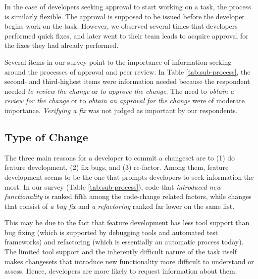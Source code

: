 In the case of developers seeking approval to start working on a task, the process is similarly flexible. The approval is supposed to be issued before the developer begins work on the task. However, we observed several times that developers performed quick fixes, and later went to their team leads to acquire approval for the fixes they had already performed.

Several items in our survey point to the importance of information-seeking around the processes of approval and peer review. In Table \ref{tab:sub-process}, the second- and third-highest items were information needed because the respondent needed \emph{to review the change} or \emph{to approve the change}. The need to  \emph{obtain a review for the change} or to \emph{obtain an approval for the change} were of moderate importance. \emph{Verifying a fix} was not judged as important by our respondents.

\subsection{Type of Change}

The three main reasons for a developer to commit a changeset are to (1) do feature development, (2) fix bugs, and (3) re-factor. Among them, feature development seems to be the one that prompts developers to seek information the most.
In our survey (Table \ref{tab:sub-process}), code that \emph{introduced new functionality} is ranked fifth among the code-change related factors, while changes that consist of \emph{a bug fix} and \emph{a refactoring} ranked far lower on the same list.

This may be due to the fact that feature development has less tool support than bug fixing (which is supported by debugging tools and automated test frameworks) and refactoring (which is essentially an automatic process today). The limited tool support and the inherently difficult nature of the task itself makes changesets that introduce new functionality more difficult to understand or assess. Hence, developers are more likely to request information about them.





